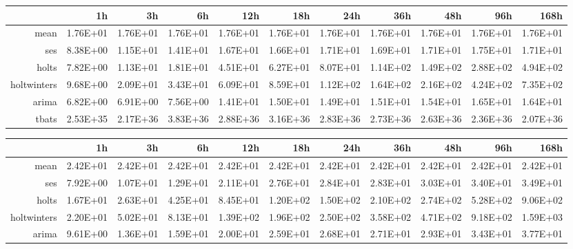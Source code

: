 \begin{landscape}
\begin{table}[ht]
\begin{tabular}{rrrrrrrrrrr}
   \hline
\end{tabular}
\end{table}
\begin{table}[ht]
\centering
\begin{tabular}{rrrrrrrrrrr}
  \hline
 & 1h & 3h & 6h & 12h & 18h & 24h & 36h & 48h & 96h & 168h \\ 
  \hline
mean & 1.76E+01 & 1.76E+01 & 1.76E+01 & 1.76E+01 & 1.76E+01 & 1.76E+01 & 1.76E+01 & 1.76E+01 & 1.76E+01 & 1.76E+01 \\ 
  ses & 8.38E+00 & 1.15E+01 & 1.41E+01 & 1.67E+01 & 1.66E+01 & 1.71E+01 & 1.69E+01 & 1.71E+01 & 1.75E+01 & 1.71E+01 \\ 
  holts & 7.82E+00 & 1.13E+01 & 1.81E+01 & 4.51E+01 & 6.27E+01 & 8.07E+01 & 1.14E+02 & 1.49E+02 & 2.88E+02 & 4.94E+02 \\ 
  holtwinters & 9.68E+00 & 2.09E+01 & 3.43E+01 & 6.09E+01 & 8.59E+01 & 1.12E+02 & 1.64E+02 & 2.16E+02 & 4.24E+02 & 7.35E+02 \\ 
  arima & 6.82E+00 & 6.91E+00 & 7.56E+00 & 1.41E+01 & 1.50E+01 & 1.49E+01 & 1.51E+01 & 1.54E+01 & 1.65E+01 & 1.64E+01 \\ 
  tbats & 2.53E+35 & 2.17E+36 & 3.83E+36 & 2.88E+36 & 3.16E+36 & 2.83E+36 & 2.73E+36 & 2.63E+36 & 2.36E+36 & 2.07E+36 \\ 
   \hline
\end{tabular}
\end{table}
\begin{table}[ht]
\centering
\begin{tabular}{rrrrrrrrrrr}
  \hline
 & 1h & 3h & 6h & 12h & 18h & 24h & 36h & 48h & 96h & 168h \\ 
  \hline
mean & 2.42E+01 & 2.42E+01 & 2.42E+01 & 2.42E+01 & 2.42E+01 & 2.42E+01 & 2.42E+01 & 2.42E+01 & 2.42E+01 & 2.42E+01 \\ 
  ses & 7.92E+00 & 1.07E+01 & 1.29E+01 & 2.11E+01 & 2.76E+01 & 2.84E+01 & 2.83E+01 & 3.03E+01 & 3.40E+01 & 3.49E+01 \\ 
  holts & 1.67E+01 & 2.63E+01 & 4.25E+01 & 8.45E+01 & 1.20E+02 & 1.50E+02 & 2.10E+02 & 2.74E+02 & 5.28E+02 & 9.06E+02 \\ 
  holtwinters & 2.20E+01 & 5.02E+01 & 8.13E+01 & 1.39E+02 & 1.96E+02 & 2.50E+02 & 3.58E+02 & 4.71E+02 & 9.18E+02 & 1.59E+03 \\ 
  arima & 9.61E+00 & 1.36E+01 & 1.59E+01 & 2.00E+01 & 2.59E+01 & 2.68E+01 & 2.71E+01 & 2.93E+01 & 3.43E+01 & 3.77E+01 \\ 

\end{tabular}
\end{table}
\end{landscape}
